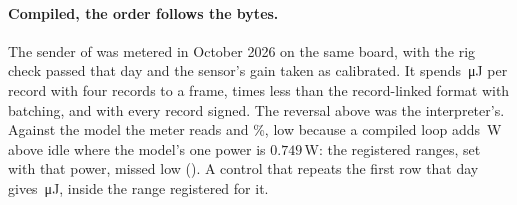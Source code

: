 \paragraph{Compiled, the order follows the bytes.} The sender of  was metered
in October 2026 on the same board, with the rig check passed that day and the sensor's gain taken
as calibrated. It spends \enRustMeas\,\si{\micro\joule} per record with four records to a frame,
\enFirstOverRust{} times less than the record-linked format with batching, and \enRustOneMeas{} with every
record signed. The reversal above was the interpreter's. Against the model the meter reads
\enRustGap{} and \enRustOneGap\%, low because a compiled loop adds \enRustPower\,W above idle where
the model's one power is $0.749$\,W: the registered ranges, set with that power, missed low
(). A control that repeats the first row that day gives
\enCtlNewMeas\,\si{\micro\joule}, inside the range registered for it.
